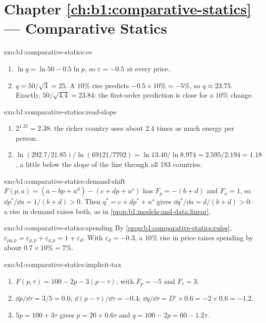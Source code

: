 \section*{Chapter \ref{ch:b1:comparative-statics} --- Comparative Statics}

\begin{solution}{exo:b1:comparative-statics:ce}
\begin{enumerate}
  \item $\ln q = \ln 50 - 0.5\ln p$, so $\varepsilon = -0.5$ at every price.
  \item $q = 50/\sqrt 4 = 25$. A $10\%$ rise predicts $-0.5 \times 10\% = -5\%$,
    so $q \approx 23.75$. Exactly, $50/\sqrt{4.4} = 23.84$: the first-order
    prediction is close for a $10\%$ change.
\end{enumerate}
\end{solution}

\begin{solution}{exo:b1:comparative-statics:read-slope}
\begin{enumerate}
  \item $2^{1.25} = 2.38$: the richer country uses about 2.4 times as much energy per person.
  \item $\ln(292.7/21.85)/\ln(69121/7702) = \ln 13.40/\ln 8.974 = 2.595/2.194 = 1.18$,
    a little below the slope of the line through all 183 countries.
\end{enumerate}
\end{solution}

\begin{solution}{exo:b1:comparative-statics:demand-shift}
$F(p, a) = (a - bp + u^d) - (c + dp + u^s)$ has $F_p = -(b + d)$ and $F_a = 1$, so
$\dd p^*/\dd a = 1/(b + d) > 0$. Then $q^* = c + dp^* + u^s$ gives
$\dd q^*/\dd a = d/(b + d) > 0$: a rise in demand raises both, as in
\cref{prop:b1:models-and-data:linear}.
\end{solution}

\begin{solution}{exo:b1:comparative-statics:spending}
By \cref{prop:b1:comparative-statics:rules},
$\varepsilon_{pq, p} = \varepsilon_{p,p} + \varepsilon_{q,p} = 1 + \varepsilon_d$.
With $\varepsilon_d = -0.3$, a $10\%$ rise in price raises spending by about
$0.7 \times 10\% = 7\%$.
\end{solution}

\begin{solution}{exo:b1:comparative-statics:implicit-tax}
\begin{enumerate}
  \item $F(p, \tau) = 100 - 2p - 3(p - \tau)$, with $F_p = -5$ and $F_\tau = 3$.
  \item $\dd p/\dd\tau = 3/5 = 0.6$; $\dd(p - \tau)/\dd\tau = -0.4$;
    $\dd q/\dd\tau = D' \times 0.6 = -2 \times 0.6 = -1.2$.
  \item $5p = 100 + 3\tau$ gives $p = 20 + 0.6\tau$ and $q = 100 - 2p = 60 - 1.2\tau$.
\end{enumerate}
\end{solution}

